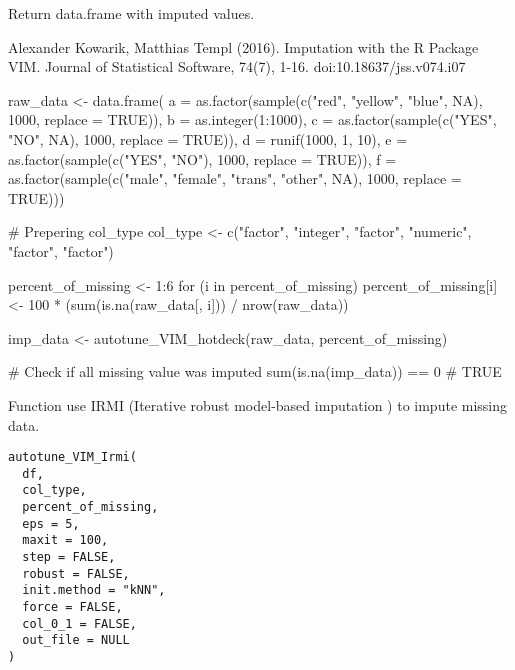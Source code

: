 \documentclass[letterpaper]{book}
\begin{document}
%
\begin{Value}
Return data.frame with imputed values.
\end{Value}
%
\begin{References}\relax
Alexander Kowarik, Matthias Templ (2016). Imputation with the R Package VIM. Journal of Statistical Software, 74(7), 1-16. doi:10.18637/jss.v074.i07
\end{References}
%
\begin{Examples}
\begin{ExampleCode}
{
  raw_data <- data.frame(
    a = as.factor(sample(c("red", "yellow", "blue", NA), 1000, replace = TRUE)),
    b = as.integer(1:1000),
    c = as.factor(sample(c("YES", "NO", NA), 1000, replace = TRUE)),
    d = runif(1000, 1, 10),
    e = as.factor(sample(c("YES", "NO"), 1000, replace = TRUE)),
    f = as.factor(sample(c("male", "female", "trans", "other", NA), 1000, replace = TRUE)))

  # Prepering col_type
  col_type <- c("factor", "integer", "factor", "numeric", "factor", "factor")

  percent_of_missing <- 1:6
  for (i in percent_of_missing) {
    percent_of_missing[i] <- 100 * (sum(is.na(raw_data[, i])) / nrow(raw_data))
  }


  imp_data <- autotune_VIM_hotdeck(raw_data, percent_of_missing)

  # Check if all missing value was imputed
  sum(is.na(imp_data)) == 0
  # TRUE
}
\end{ExampleCode}
\end{Examples}
%
\begin{Description}\relax
Function use IRMI (Iterative robust model-based imputation ) to impute missing data.
\end{Description}
%
\begin{Usage}
\begin{verbatim}
autotune_VIM_Irmi(
  df,
  col_type,
  percent_of_missing,
  eps = 5,
  maxit = 100,
  step = FALSE,
  robust = FALSE,
  init.method = "kNN",
  force = FALSE,
  col_0_1 = FALSE,
  out_file = NULL
)
\end{verbatim}
\end{Usage}
%
\end{document}
